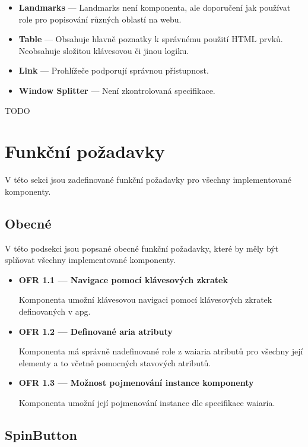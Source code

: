 \begin{itemize}
      \item \textbf{Landmarks} --- Landmarks není komponenta, ale doporučení jak používat role pro popisování různých oblastí na webu.
      \item \textbf{Table} --- Obsahuje hlavně poznatky k správnému použití HTML prvků. Neobsahuje složitou klávesovou či jinou logiku.
      \item \textbf{Link} --- Prohlížeče podporují správnou přístupnost.
      \item \textbf{Window Splitter} --- Není zkontrolovaná specifikace.
\end{itemize}

TODO

\section{Funkční požadavky}

V této sekci jsou zadefinované funkční požadavky pro všechny implementované komponenty.

\subsection{Obecné}

V této podsekci jsou popsané obecné funkční požadavky, které by měly být splňovat všechny implementované komponenty.

\begin{itemize}
      \item \textbf{OFR 1.1 --- Navigace pomocí klávesových zkratek}\label{ofr11}

            Komponenta umožní klávesovou navigaci pomocí klávesových zkratek definovaných v \gls{apg}.

      \item \textbf{OFR 1.2 --- Definované aria atributy}\label{ofr12}

            Komponenta má správně nadefinované role z \gls{waiaria} atributů pro všechny její elementy a to včetně pomocných stavových atributů.

      \item \textbf{OFR 1.3 --- Možnost pojmenování instance komponenty}\label{ofr13}

            Komponenta umožní její pojmenování instance dle specifikace \gls{waiaria}.
\end{itemize}


\subsection{SpinButton}

